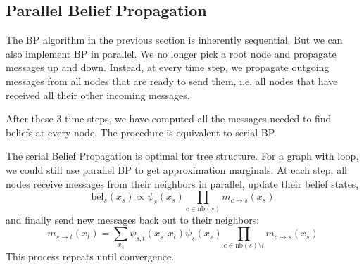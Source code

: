 \documentclass{harvardml}
\theoremstyle{definition}
\theoremstyle{plain}
\theoremstyle{definition}
\theoremstyle{remark}
\begin{document}
\subsection{Parallel Belief Propagation}
The BP algorithm in the previous section is inherently sequential. But we can also implement BP in parallel. We no longer pick a root node and propagate messages up and down. Instead, at every time step, we propagate outgoing messages from all nodes that are ready to send them, i.e. all nodes that have received all their other incoming messages.\\
\medskip

\medskip 

\noindent After these 3 time steps, we have computed all the messages needed to find beliefs at every node. The procedure is equivalent to serial BP.

The serial Belief Propagation is optimal for tree structure. For a graph with loop, we could still use parallel BP to get approximation marginals. At each step, all nodes receive messages from their neighbors in parallel, update their belief states, $$\text{bel}_s (x_s) \propto\psi_s(x_s)\prod_{c \in \text{nb}(s)}m_{c\rightarrow s}(x_s)$$
and finally send new messages back out to their neighbors: $$m_{s \rightarrow t} (x_t) = \sum_{x_s}\psi_{s,t}(x_s,x_t)\psi_s(x_s)\prod_{c \in \text{nb}(s)\setminus t} m_{c \rightarrow s}(x_s) $$
This process repeats until convergence. 
\end{document}
